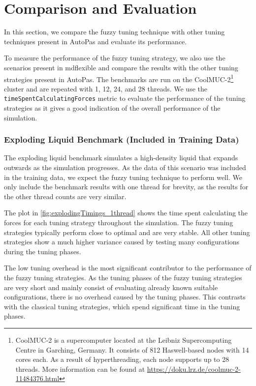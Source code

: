 \chapter{Comparison and Evaluation}
\label{sec:comparison_and_evaluation}

In this section, we compare the fuzzy tuning technique with other tuning techniques present in AutoPas and evaluate its performance.

To measure the performance of the fuzzy tuning strategy, we also use the scenarios present in \gls{mdflexible} and compare the results with the other tuning strategies present in AutoPas. The benchmarks are run on the CoolMUC-2\footnote{CoolMUC-2 is a supercomputer located at the Leibniz Supercomputing Centre in Garching, Germany. It consists of 812 Haswell-based nodes with 14 cores each. As a result of hyperthreading, each node supports up to 28 threads. More information can be found at \url{https://doku.lrz.de/coolmuc-2-11484376.html}} cluster and are repeated with 1, 12, 24, and 28 threads. We use the \texttt{timeSpentCalculatingForces} metric to evaluate the performance of the tuning strategies as it gives a good indication of the overall performance of the simulation.


\subsection{Exploding Liquid Benchmark (Included in Training Data)}

The exploding liquid benchmark simulates a high-density liquid that expands outwards as the simulation progresses. As the data of this scenario was included in the training data, we expect the fuzzy tuning technique to perform well. We only include the benchmark results with one thread for brevity, as the results for the other thread counts are very similar.

The plot in \autoref{fig:explodingTimings_1thread} shows the time spent calculating the forces for each tuning strategy throughout the simulation. The fuzzy tuning strategies typically perform close to optimal and are very stable. All other tuning strategies show a much higher variance caused by testing many configurations during the tuning phases.

The low tuning overhead is the most significant contributor to the performance of the fuzzy tuning strategies. As the tuning phases of the fuzzy tuning strategies are very short and mainly consist of evaluating already known suitable configurations, there is no overhead caused by the tuning phases. This contrasts with the classical tuning strategies, which spend significant time in the tuning phases.

